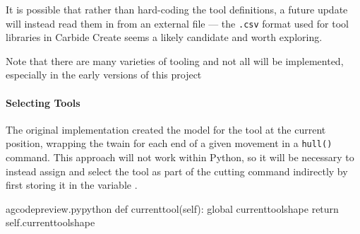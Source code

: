 \documentclass{ltxdoc}
\begin{document}
It is possible that rather than hard-coding the tool definitions, a future update will instead read them in from an external file --- the \texttt{.csv} format used for tool libraries in Carbide Create seems a likely candidate and worth exploring.

Note that there are many varieties of tooling and not all will be implemented, especially in the early versions of this project
 
\paragraph{Selecting Tools}
 
The original implementation created the model for the tool at the current position, wrapping the twain for each end of a given movement in a \verb|hull()| command. This approach will not work within Python, so it will be necessary to instead assign and select the tool as part of the cutting command indirectly by first storing it in the variable .

\lstset{firstnumber=\thegcpy}
\begin{writecode}{a}{gcodepreview.py}{python}
    def currenttool(self):
        global currenttoolshape
        return self.currenttoolshape

\end{writecode}
\addtocounter{gcpy}{4}
\end{document}
